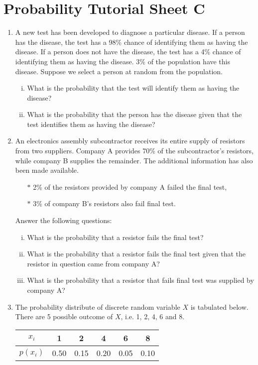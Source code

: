 \documentclass[a4paper,12pt]{article}
\begin{document}
\section*{Probability Tutorial Sheet C}
\begin{enumerate}

\item A new test has been developed to diagnose a particular disease. 
If a person has the disease, the test has a 98\% chance of identifying them as having the 
disease. If a person does not have the disease, the test has a 4\% chance of identifying them as having the disease. 3\% of the population have this disease. 
Suppose we select a person at random from the population.

\begin{enumerate}[(i)]
\item  What is the probability that the test will identify them as having the disease?
\item  What is the probability that the person has the disease given that the test identifies 
them as having the disease?
\end{enumerate}

    \item 
An electronics assembly subcontractor receives its entire supply of resistors from two suppliers. Company A provides 70\% of the subcontractor's resistors, while company B supplies the remainder. The additional information has also been made available.
\begin{itemize}
\item[$\ast$] 2\% of the resistors provided by company A failed the final test,
\item[$\ast$] 3\% of company B's resistors also fail final test.
\end{itemize}
\noindent Answer the following questions:
\begin{enumerate}[(i)]
\item  What is the probability that a resistor fails the final test?
\item   What is the probability that a resistor fails the final test given that the resistor in question came from company A?
\item What is the probability that a resistor that fails final test was supplied by company A?
\end{enumerate}

\item 
The probability distribute of discrete random variable $X$ is tabulated below. There are 5 possible outcome of $X$, i.e. 1, 2, 4, 6 and 8.
\begin{center}
\begin{tabular}{|c||c|c|c|c|c|}
\hline
$x_i$  & 1 & 2 & 4 & 6 & 8  \\\hline
$p(x_i)$ & 0.50 & 0.15 & 0.20 & 0.05 & 0.10 \\
\hline
\end{tabular}
\end{center}


\end{enumerate}
\end{document}
